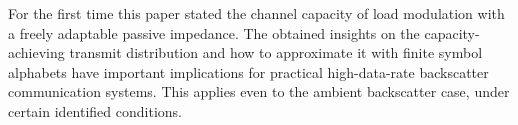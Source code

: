 For the first time this paper stated the channel capacity of load modulation with a freely adaptable passive impedance. The obtained insights on the capacity-achieving transmit distribution and how to approximate it with finite symbol alphabets have important implications for practical high-data-rate backscatter communication systems. This applies even to the ambient backscatter case, under certain identified conditions.